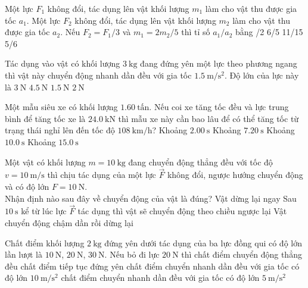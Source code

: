 \begin{ex}
	Một lực $F_1$ không đổi, tác dụng lên vật khối lượng $m_1$ làm cho vật thu được gia tốc $a_1$.  Một lực $F_2$ không đổi, tác dụng lên vật khối lượng $m_2$ làm cho vật thu được gia tốc $a_2$. Nếu $F_2=F_1/3$ và $m_1=2m_2/5$ thì tỉ số $a_1/a_2$ bằng
	\choice
	{/2}
	{6/5}
	{11/15}
	{5/6}
	\loigiai{}
\end{ex}
\begin{ex}
	Tác dụng vào vật có khối lượng $\SI{3}{\kilogram}$ đang đứng yên một lực theo phương ngang thì vật này chuyển động nhanh dần đều với gia tốc $\SI{1.5}{\meter/\second^2}$. Độ lớn của lực này là
	\choice
	{$\SI{3}{\newton}$}
	{\True $\SI{4.5}{\newton}$}
	{$\SI{1.5}{\newton}$}
	{$\SI{2}{\newton}$}
	\loigiai{}
\end{ex}
\begin{ex}
	Một mẫu siêu xe có khối lượng $\SI{1.60}{\text{tấn}}$. Nếu coi xe tăng tốc đều và lực trung bình để tăng tốc xe là $\SI{24.0}{\kilo\newton}$ thì mẫu xe này cần bao lâu để có thể tăng tốc từ trạng thái nghỉ lên đến tốc độ $\SI{108}{\kilo\meter/\hour}$?
	\choice
	{\True Khoảng $\SI{2.00}{\second}$}
	{Khoảng $\SI{7.20}{\second}$}
	{Khoảng $\SI{10.0}{\second}$}
	{Khoảng $\SI{15.0}{\second}$}
	\loigiai{}
\end{ex}
\begin{ex}
	Một vật có khối lượng $m=\SI{10}{\kilogram}$ đang chuyển động thẳng đều với tốc độ $v=\SI{10}{\meter/\second}$ thì chịu tác dụng của một lực $\vec{F}$ không đổi, ngược hướng chuyển động và có độ lớn $F=\SI{10}{\newton}$.\\ Nhận định nào sau đây về chuyển động của vật là đúng?
	\choice
	{Vật dừng lại ngay}
	{\True Sau $\SI{10}{\second}$ kể từ lúc lực $\vec{F}$ tác dụng thì vật sẽ chuyển động theo chiều ngược lại}
	{Vật chuyển động chậm dần rồi dừng lại}
	{}
	\loigiai{}
\end{ex}
\begin{ex}
	Chất điểm khối lượng $\SI{2}{\kilogram}$ đứng yên dưới tác dụng của ba lực đồng qui có độ lớn lần lượt là $\SI{10}{\newton}$, $\SI{20}{\newton}$, $\SI{30}{\newton}$. Nếu bỏ đi lực $\SI{20}{\newton}$ thì
	\choice
	{chất điểm chuyển động thẳng đều}
	{chất điểm tiếp tục đứng yên}
	{\True chất điểm chuyển nhanh dần đều với gia tốc có độ lớn $\SI{10}{\meter/\second^2}$}
	{chất điểm chuyển nhanh dần đều với gia tốc có độ lớn $\SI{5}{\meter/\second^2}$}
	\loigiai{}
\end{ex}
